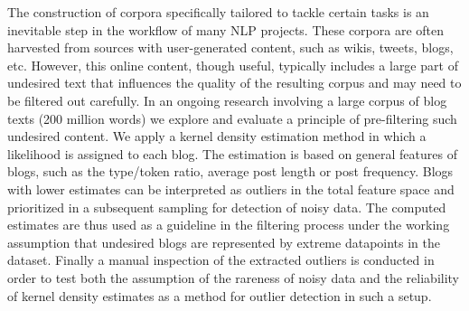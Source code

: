 \documentclass[10pt, a4paper, twopage, headinclude, footinclude, BCOR5mm]{book}
\begin{document}
\begin{table}[t!]
\end{table} 
\begin{table}[t!]
\end{table} 
\noindent
The construction of corpora specifically tailored to tackle certain tasks is an inevitable step in the workflow of many NLP projects. These corpora are often harvested from sources with user-generated content, such as wikis, tweets, blogs, etc. However, this online content, though useful, typically includes a large part of undesired text that influences the quality of the resulting corpus and may need to be filtered out carefully.  In an ongoing research involving a large corpus of blog texts (200 million words) we explore and evaluate a principle of pre-filtering such undesired content. We apply a kernel density estimation method in which a likelihood is assigned to each blog. The estimation is based on general features of blogs, such as the type/token ratio, average post length or post frequency. Blogs with lower estimates can be interpreted as outliers in the total feature space and prioritized in a subsequent sampling for detection of noisy data. The computed estimates are thus used as a guideline in the filtering process under the working assumption that undesired blogs are represented by extreme datapoints in the dataset. Finally a manual inspection of the extracted outliers is conducted in order to test both the assumption of the rareness of noisy data and the reliability of kernel density estimates as a method for outlier detection in such a setup.  
\end{document}
